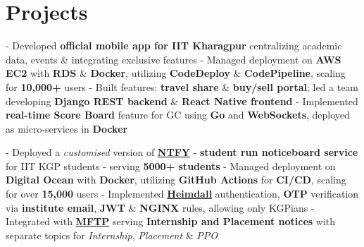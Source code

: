\documentclass[a4paper,10pt]{extarticle} %
\begin{document}
 \vspace{-0.1cm}
\section{\textcolor{primary}{Projects}}
 \vspace{0.1cm}
\begin{description}[style=nextline, font=$\bullet$\hspace{2mm}\normalsize]

 \item[{\href{https://play.google.com/store/apps/details?id=com.apnainsti&pli=1}{ApnaInsti}} | Golang, AWS, Docker, Nginx ] 
- Developed \textbf{official mobile app for IIT Kharagpur} centralizing academic data, events \& integrating exclusive features \newline
- Managed deployment on \textbf{AWS EC2} with \textbf{RDS} \& \textbf{Docker}, utilizing \textbf{CodeDeploy} \& \textbf{CodePipeline}, scaling for \textbf{10,000+} users \newline
- Built features: \textbf{travel share} \& \textbf{buy/sell portal}; led a team developing \textbf{Django REST backend} \& \textbf{React Native frontend} \newline
- Implemented \textbf{real-time Score Board} feature for GC using \textbf{Go} and \textbf{WebSockets}, deployed as micro-services in \textbf{Docker}

 \item[{\href{https://naarad.metakgp.org}{Naarad}} | Golang, Nginx, Digital Ocean, GitHub Actions, Docker ] 
- Deployed a \textit{customised} version of \href{https://ntfy.sh/app}{\textbf{NTFY}} - \textbf{student run noticeboard service} for IIT KGP students - serving \textbf{5000+ students} \newline
- Managed deployment on \textbf{Digital Ocean} with \textbf{Docker}, utilizing \textbf{GitHub Actions} for \textbf{CI/CD}, scaling for over \textbf{15,000} users \newline
- Implemented \href{https://heimdall.metakgp.org}{\textbf{Heimdall}} authentication, \textbf{OTP} verification via \textbf{institute email}, \textbf{JWT} \& \textbf{NGINX} rules, allowing only KGPians \newline
- Integrated with \href{https://github.com/metakgp/mftp}{\textbf{MFTP}} serving \textbf{Internship and Placement notices} with separate topics for \textit{Internship}, \textit{Placement} \& \textit{PPO}


\end{description}
\end{document}
